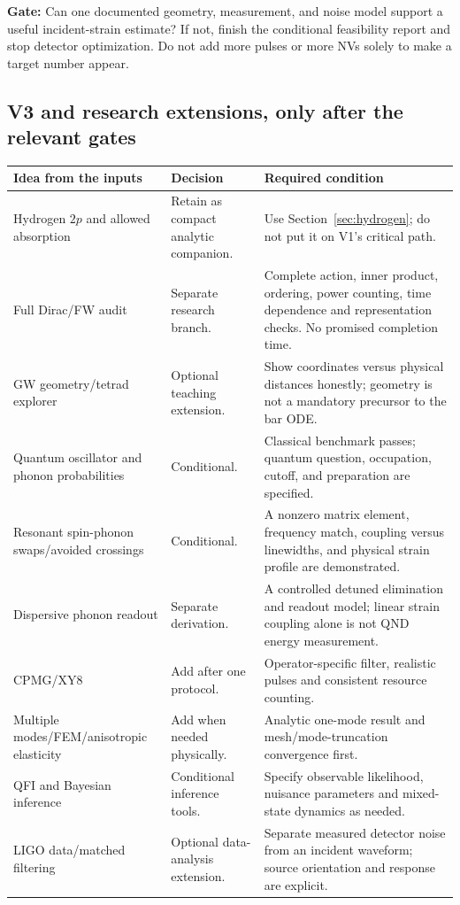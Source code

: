 \documentclass[a4paper,11pt]{article}
\begin{document}
\textbf{Gate:} Can one documented geometry, measurement, and noise model support a useful incident-strain estimate? If not, finish the conditional feasibility report and stop detector optimization. Do not add more pulses or more NVs solely to make a target number appear.

\subsection{V3 and research extensions, only after the relevant gates}

\begin{longtable}{@{}P{39mm}P{46mm}P{68mm}@{}}\toprule
Idea from the inputs & Decision & Required condition\\\midrule\endhead
Hydrogen $2p$ and allowed absorption & Retain as compact analytic companion. & Use Section~\ref{sec:hydrogen}; do not put it on V1's critical path.\\
Full Dirac/FW audit & Separate research branch. & Complete action, inner product, ordering, power counting, time dependence and representation checks. No promised completion time.\\
GW geometry/tetrad explorer & Optional teaching extension. & Show coordinates versus physical distances honestly; geometry is not a mandatory precursor to the bar ODE.\\
Quantum oscillator and phonon probabilities & Conditional. & Classical benchmark passes; quantum question, occupation, cutoff, and preparation are specified.\\
Resonant spin-phonon swaps/avoided crossings & Conditional. & A nonzero matrix element, frequency match, coupling versus linewidths, and physical strain profile are demonstrated.\\
Dispersive phonon readout & Separate derivation. & A controlled detuned elimination and readout model; linear strain coupling alone is not QND energy measurement.\\
CPMG/XY8 & Add after one protocol. & Operator-specific filter, realistic pulses and consistent resource counting.\\
Multiple modes/FEM/anisotropic elasticity & Add when needed physically. & Analytic one-mode result and mesh/mode-truncation convergence first.\\
QFI and Bayesian inference & Conditional inference tools. & Specify observable likelihood, nuisance parameters and mixed-state dynamics as needed.\\
LIGO data/matched filtering & Optional data-analysis extension. & Separate measured detector noise from an incident waveform; source orientation and response are explicit.\\

\end{longtable}
\end{document}
